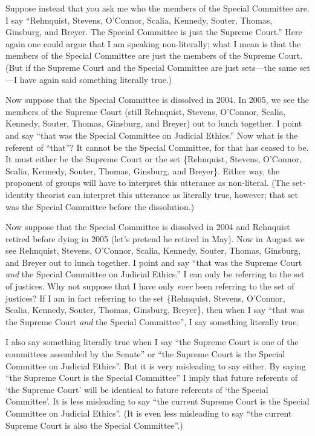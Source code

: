 \documentclass[11pt]{article}
\begin{document}
\begin{spacing}{1.5}
Suppose instead that you ask me who the members of the Special
Committee are.  I say ``Rehnquist, Stevens, O'Connor, Scalia, Kennedy,
Souter, Thomas, Ginsburg, and Breyer.  The Special Committee is just
the Supreme Court.''  Here again one could argue that I am speaking
non-literally; what I mean is that the members of the Special
Committee are just the members of the Supreme Court.  (But if the
Supreme Court and the Special Committee are just sets---the same
set---I have again said something literally true.)

Now suppose that the Special Committee is dissolved in 2004.  In 2005,
we see the members of the Supreme Court (still Rehnquist, Stevens,
O'Connor, Scalia, Kennedy, Souter, Thomas, Ginsburg, and Breyer) out
to lunch together.  I point and say ``that was the Special Committee
on Judicial Ethics.''  Now what is the referent of ``that''?  It
cannot be the Special Committee, for that has ceased to be.  It must
either be the Supreme Court or the set \{Rehnquist, Stevens, O'Connor,
Scalia, Kennedy, Souter, Thomas, Ginsburg, and Breyer\}.  Either way,
the proponent of groups will have to interpret this utterance as
non-literal.  (The set-identity theorist can interpret this utterance
as literally true, however; that set was the Special Committee before
the dissolution.)

Now suppose that the Special Committee is dissolved in 2004 and
Rehnquist retired before dying in 2005 (let's pretend he retired in
May).  Now in August we see Rehnquist, Stevens, O'Connor, Scalia,
Kennedy, Souter, Thomas, Ginsburg, and Breyer out to lunch together.
I point and say ``that was the Supreme Court {\em and} the Special
Committee on Judicial Ethics.''  I can only be referring to the set of
justices.  Why not suppose that I have only {\em ever} been referring
to the set of justices?  If I am in fact referring to the set
\{Rehnquist, Stevens, O'Connor, Scalia, Kennedy, Souter, Thomas,
Ginsburg, Breyer\}, then when I say ``that was the Supreme Court {\em
  and} the Special Committee'', I say something literally true.

I also say something literally true when I say ``the Supreme Court is
one of the committees assembled by the Senate'' or ``the Supreme Court
is the Special Committee on Judicial Ethics''.  But it is very
misleading to say either.  By saying ``the Supreme Court is the
Special Committee'' I imply that future referents of `the Supreme
Court' will be identical to future referents of `the Special
Committee'.  It is less misleading to say ``the current Supreme Court
is the Special Committee on Judicial Ethics''.  (It is even less
misleading to say ``the current Supreme Court is also the Special
Committee''.)


\end{spacing}
\end{document}
